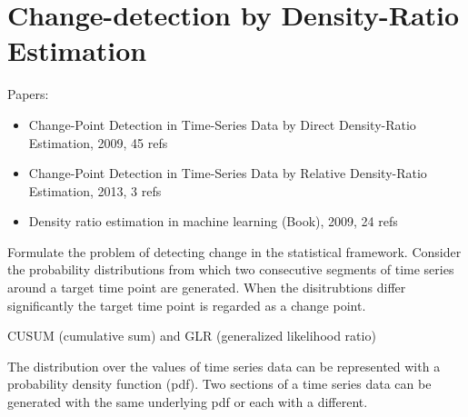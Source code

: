 \section{Change-detection by Density-Ratio Estimation}\label{density-ratio}

Papers:
\begin{itemize}
  \item Change-Point Detection in Time-Series Data by Direct Density-Ratio Estimation, 2009, 45 refs \cite{kawahara2009change}
  \item Change-Point Detection in Time-Series Data by Relative Density-Ratio Estimation, 2013, 3 refs \cite{liu2013change}
  \item Density ratio estimation in machine learning (Book), 2009, 24 refs \cite{sugiyama2012density}
\end{itemize}

Formulate the problem of detecting change in the statistical framework.
Consider the probability distributions from which two consecutive segments of time series around a target time point are generated.
When the disitrubtions differ significantly the target time point is regarded as a change point.




CUSUM (cumulative sum) \cite{basseville1993detection} and GLR (generalized likelihood ratio)


The distribution over the values of time series data can be represented with a probability density function (pdf).
Two sections of a time series data can be generated with the same underlying pdf or each with a different.
